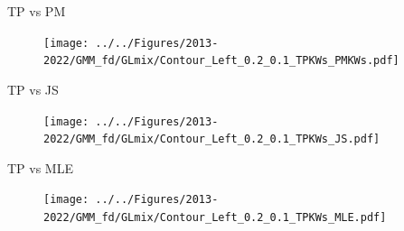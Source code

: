 \documentclass[10pt,mathserif,aspectratio=169]{beamer}
\begin{document}
\begin{frame}[label=tpcontour]{TP vs PM}
  \begin{figure}
    \centering
    \texttt{[image: ../../Figures/2013-2022/GMM\_fd/GLmix/Contour\_Left\_0.2\_0.1\_TPKWs\_PMKWs.pdf]}
  \end{figure}
  \hyperlink{tpselect}{}
\end{frame}

\begin{frame}{TP vs JS}
  \begin{figure}
    \centering
    \texttt{[image: ../../Figures/2013-2022/GMM\_fd/GLmix/Contour\_Left\_0.2\_0.1\_TPKWs\_JS.pdf]}
  \end{figure}
\end{frame}

\begin{frame}{TP vs MLE}
  \begin{figure}
    \centering
    \texttt{[image: ../../Figures/2013-2022/GMM\_fd/GLmix/Contour\_Left\_0.2\_0.1\_TPKWs\_MLE.pdf]}
  \end{figure}
\end{frame}
\end{document}
